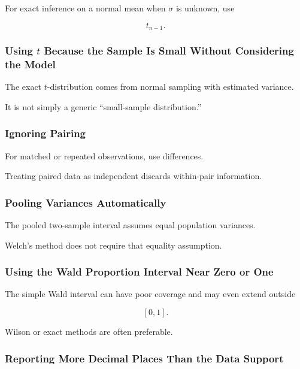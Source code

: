 For exact inference on a normal mean when \(\sigma\) is unknown, use

\[
\boxed{
t_{n-1}.
}
\]

\subsubsection{Using \(t\) Because the Sample Is Small Without Considering the Model}

The exact \(t\)-distribution comes from normal sampling with estimated
variance.

It is not simply a generic ``small-sample distribution.''

\subsubsection{Ignoring Pairing}

For matched or repeated observations, use differences.

Treating paired data as independent discards within-pair information.

\subsubsection{Pooling Variances Automatically}

The pooled two-sample interval assumes equal population variances.

Welch's method does not require that equality assumption.

\subsubsection{Using the Wald Proportion Interval Near Zero or One}

The simple Wald interval can have poor coverage and may even extend
outside

\[
[0,1].
\]

Wilson or exact methods are often preferable.

\subsubsection{Reporting More Decimal Places Than the Data Support}

